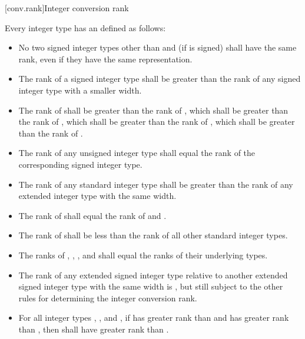 [conv.rank]{Integer conversion rank}%

\pnum
Every integer type has an  defined as follows:

\begin{itemize}
\item No two signed integer types other than  and  (if  is signed) shall have the same rank, even if they have
the same representation.

\item The rank of a signed integer type shall be greater than the rank
of any signed integer type with a smaller width.

\item The rank of  shall be greater
than the rank of , which shall be greater than
the rank of , which shall be greater than the rank of
, which shall be greater than the rank of
.

\item The rank of any unsigned integer type shall equal the rank of the
corresponding signed integer type.

\item The rank of any standard integer type shall be greater than the
rank of any extended integer type with the same width.

\item The rank of  shall equal the rank of 
and .

\item The rank of  shall be less than the rank of all other
standard integer types.

\item
{}%
%
%
The ranks of , , , and
 shall equal the ranks of their underlying
types.

\item The rank of any extended signed integer type relative to another
extended signed integer type with the same width is , but still subject to the other rules for determining the integer
conversion rank.

\item For all integer types , , and , if
 has greater rank than  and  has greater
rank than , then  shall have greater rank than
.
\end{itemize}

